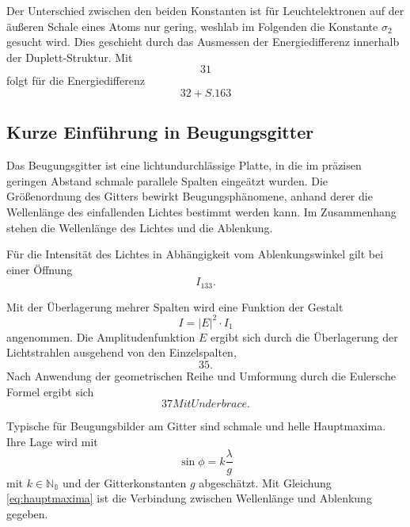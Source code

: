 Der Unterschied zwischen den beiden Konstanten ist für Leuchtelektronen auf der äußeren Schale eines Atoms nur gering, weshlab im Folgenden die Konstante $\sigma_2$ gesucht wird.
Dies geschieht durch das Ausmessen der Energiedifferenz innerhalb der Duplett-Struktur.
Mit
\begin{equation}
	31
\end{equation}
folgt für die Energiedifferenz
\begin{equation}
	32+ S.163
\end{equation}

\subsection{Kurze Einführung in Beugungsgitter}
Das Beugungsgitter ist eine lichtundurchlässige Platte, in die im präzisen geringen Abstand schmale parallele Spalten eingeätzt wurden.
Die Größenordnung des Gitters bewirkt Beugungsphänomene, anhand derer die Wellenlänge des einfallenden Lichtes bestimmt werden kann.
Im Zusammenhang stehen die Wellenlänge des Lichtes und die Ablenkung.

Für die Intensität des Lichtes in Abhängigkeit vom Ablenkungswinkel gilt bei einer Öffnung
\begin{equation}
	I_133.
\end{equation}

Mit der Überlagerung mehrer Spalten wird eine Funktion der Gestalt
\begin{equation}
	I=|E|^2\cdot I_1
\end{equation}
angenommen.
Die Amplitudenfunktion $E$ ergibt sich durch die Überlagerung der Lichtstrahlen ausgehend von den Einzelspalten,
\begin{equation}
	35.
\end{equation}
Nach Anwendung der geometrischen Reihe und Umformung durch die Eulersche Formel ergibt sich
\begin{equation}
	37 Mit Underbrace.
\end{equation}

Typische für Beugungsbilder am Gitter sind schmale und helle Hauptmaxima.
Ihre Lage wird mit 
\begin{equation}
	\sin{\phi}= k\frac{\lambda}{g} 
	\label{eq:hauptmaxima}
\end{equation}
mit $k\in\mathbb{N_0}$ und der Gitterkonstanten $g$ abgeschätzt.
Mit Gleichung \eqref{eq:hauptmaxima} ist die Verbindung zwischen Wellenlänge und Ablenkung gegeben.

